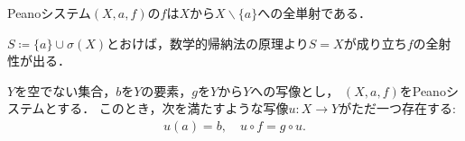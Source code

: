	\begin{screen}
		\begin{thm}[Peanoシステムの写像は全単射]\label{thm:successor_mapping_is_injective}
			Peanoシステム$(X,a,f)$の$f$は$X$から$X \backslash \{a\}$への全単射である．
		\end{thm}
	\end{screen}
	
	\begin{prf}
		$S \coloneqq \{a\} \cup \sigma(X)$とおけば，数学的帰納法の原理より$S = X$が成り立ち$f$の全射性が出る．
		\QED
	\end{prf}
	
	\begin{screen}
		\begin{thm}[再帰定理]\label{thm:Peano_recursion_theorem}
			$Y$を空でない集合，$b$を$Y$の要素，$g$を$Y$から$Y$への写像とし，
			$(X,a,f)$をPeanoシステムとする．
			このとき，次を満たすような写像$u:X \longrightarrow Y$がただ一つ存在する:
			\begin{align}
				u(a) = b,\quad u \circ f = g \circ u.
				\label{eq:thm_Peano_recursion_theorem}
			\end{align}
		\end{thm}
	\end{screen}
	
